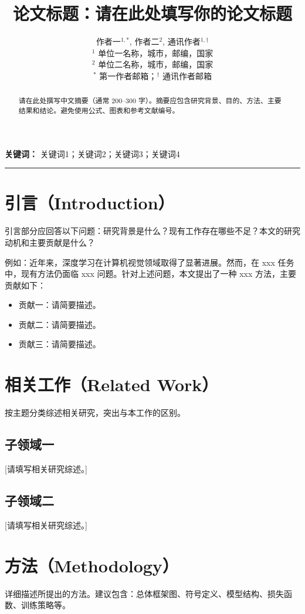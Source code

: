 \documentclass[12pt,a4paper]{article}
\title{\textbf{论文标题：请在此处填写你的论文标题}}
\author{
    作者一$^{1,*}$, \quad
    作者二$^{2}$, \quad
    通讯作者$^{1,\dagger}$ \\[0.5em]
    \small $^{1}$ 单位一名称，城市，邮编，国家 \\
    \small $^{2}$ 单位二名称，城市，邮编，国家 \\
    \small $^{*}$ 第一作者邮箱；$^{\dagger}$ 通讯作者邮箱
}
\date{}
\begin{document}
\maketitle

\begin{abstract}
请在此处撰写中文摘要（通常 200--300 字）。摘要应包含研究背景、目的、方法、主要结果和结论。避免使用公式、图表和参考文献编号。
\end{abstract}

\noindent\textbf{关键词：} 关键词1；关键词2；关键词3；关键词4

\vspace{1em}
\noindent\rule{\textwidth}{0.4pt}

\section{引言（Introduction）}
引言部分应回答以下问题：研究背景是什么？现有工作存在哪些不足？本文的研究动机和主要贡献是什么？

例如：近年来，深度学习在计算机视觉领域取得了显著进展\cite{he2016deep}。然而，在 xxx 任务中，现有方法仍面临 xxx 问题\cite{vaswani2017attention}。针对上述问题，本文提出了一种 xxx 方法，主要贡献如下：
\begin{itemize}
    \item 贡献一：请简要描述。
    \item 贡献二：请简要描述。
    \item 贡献三：请简要描述。
\end{itemize}

\section{相关工作（Related Work）}
按主题分类综述相关研究，突出与本工作的区别。

\subsection{子领域一}
[请填写相关研究综述。]

\subsection{子领域二}
[请填写相关研究综述。]

\section{方法（Methodology）}
详细描述所提出的方法。建议包含：总体框架图、符号定义、模型结构、损失函数、训练策略等。
\end{document}
